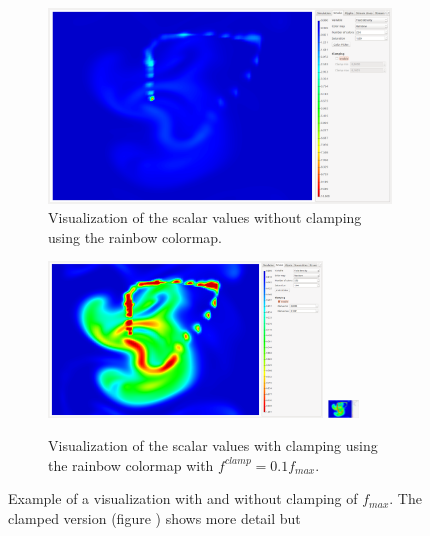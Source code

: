 \begin{figure}[tb]
	\centering
	\begin{subfigure}[t]{0.4\textwidth}
		\centering
		\includegraphics[width=\textwidth, trim={35px 30px 430px 30px}, clip]{colormapping/img/notclamped}
		\caption{Visualization of the scalar values without clamping using the rainbow colormap.}
		\label{fig:colormapping:clamped:disabled}
	\end{subfigure}
	\hspace{50px}
	\begin{subfigure}[t]{0.4\textwidth}
		\centering
		\includegraphics[width=0.8\textwidth, trim={35px 30px 430px 30px}, clip]{colormapping/img/clamped_01}
		\includegraphics[width=0.09\textwidth, trim={1435px 30px 330px 50px}, clip]{colormapping/img/clamped_01}
		\caption{Visualization of the scalar values with clamping using the rainbow colormap with $f^{clamp} = 0.1 f_{max}$.}
		\label{fig:colormapping:clamped:enabled}
	\end{subfigure}	
	\caption{Example of a visualization with and without clamping of $f_{max}$. The clamped version (figure ) shows more detail but }
	\label{fig:colormapping:clamped}
\end{figure}




